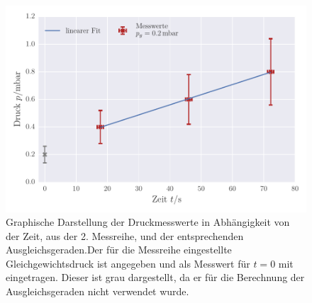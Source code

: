 \begin{figure}[!h]
 \centering
 \includegraphics[scale=0.8]{../Grafiken/Leckrate_Drehschieber_1.pdf}
 \caption{Graphische Darstellung der Druckmesswerte in Abhängigkeit von der Zeit, aus der 2. Messreihe, und der
 	entsprechenden Ausgleichsgeraden.Der für die Messreihe eingestellte Gleichgewichtsdruck ist angegeben und als Messwert für $t=0$ mit eingetragen. Dieser ist grau dargestellt, da er für die 
 	Berechnung der Ausgleichsgeraden nicht verwendet wurde. \label{fig:leckrate_drehschieber_1}}
 \end{figure} 